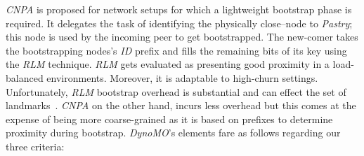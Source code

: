 \emph{CNPA} is proposed for network setups for which a lightweight
bootstrap phase is required.
It delegates the task of identifying the physically
close--node to \emph{Pastry}; this node is used by the 
incoming peer to get bootstrapped.
The new-comer takes the bootstrapping nodes's \emph{ID} prefix 
and fills the remaining bits of its key using the \emph{RLM} technique.
\emph{RLM} gets evaluated as presenting good proximity in a load-balanced 
environments. Moreover, it is adaptable to high-churn settings.
Unfortunately, \emph{RLM} bootstrap overhead is substantial and can 
effect the set of landmarks~\cite{WZS2004}.
\emph{CNPA} on the other hand, incurs less overhead but this comes 
at the expense of being more coarse-grained as it is based on prefixes
to determine proximity during bootstrap.
%
%
%
\emph{DynoMO}'s elements fare as follows regarding our three criteria:
